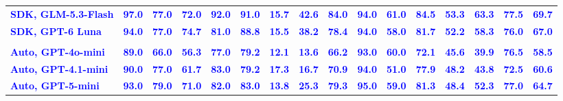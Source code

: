 \documentclass{article}
\newcommand{\ours}{\rowcolor{oursbg}}
\newcommand{\nativechange}[1]{\textcolor{blue}{#1}}
\newlength{\mw}\newlength{\cw}
\begin{document}
\begin{table}[t]
\begin{tabular}{@{}>{\raggedright\arraybackslash}p{\mw}*{15}{>{\centering\arraybackslash}p{\cw}}@{}}
\ours \nativechange{\textbf{SDK, GLM-5.3-Flash}} & \nativechange{\textbf{97.0}} & \nativechange{\textbf{77.0}} & \nativechange{\textbf{72.0}} & \nativechange{\textbf{92.0}} & \nativechange{\textbf{91.0}} & \nativechange{\textbf{15.7}} & \nativechange{\textbf{42.6}} & \nativechange{\textbf{84.0}} & \nativechange{\textbf{94.0}} & \nativechange{\textbf{61.0}} & \nativechange{\textbf{84.5}} & \nativechange{\textbf{53.3}} & \nativechange{\textbf{63.3}} & \nativechange{\textbf{77.5}} & \nativechange{\textbf{69.7}} \\
\ours \nativechange{\textbf{SDK, GPT-6 Luna}} & \nativechange{\textbf{94.0}} & \nativechange{\textbf{77.0}} & \nativechange{\textbf{74.7}} & \nativechange{\textbf{81.0}} & \nativechange{\textbf{88.8}} & \nativechange{\textbf{15.5}} & \nativechange{\textbf{38.2}} & \nativechange{\textbf{78.4}} & \nativechange{\textbf{94.0}} & \nativechange{\textbf{58.0}} & \nativechange{\textbf{81.7}} & \nativechange{\textbf{52.2}} & \nativechange{\textbf{58.3}} & \nativechange{\textbf{76.0}} & \nativechange{\textbf{67.0}} \\
\multicolumn{16}{l}{\nativechange{\textbf{SDK: per-store automatic configuration}}}\\
\ours \nativechange{\textbf{Auto, GPT-4o-mini}} & \nativechange{\textbf{89.0}} & \nativechange{\textbf{66.0}} & \nativechange{\textbf{56.3}} & \nativechange{\textbf{77.0}} & \nativechange{\textbf{79.2}} & \nativechange{\textbf{12.1}} & \nativechange{\textbf{13.6}} & \nativechange{\textbf{66.2}} & \nativechange{\textbf{93.0}} & \nativechange{\textbf{60.0}} & \nativechange{\textbf{72.1}} & \nativechange{\textbf{45.6}} & \nativechange{\textbf{39.9}} & \nativechange{\textbf{76.5}} & \nativechange{\textbf{58.5}} \\
\ours \nativechange{\textbf{Auto, GPT-4.1-mini}} & \nativechange{\textbf{90.0}} & \nativechange{\textbf{77.0}} & \nativechange{\textbf{61.7}} & \nativechange{\textbf{83.0}} & \nativechange{\textbf{79.2}} & \nativechange{\textbf{17.3}} & \nativechange{\textbf{16.7}} & \nativechange{\textbf{70.9}} & \nativechange{\textbf{94.0}} & \nativechange{\textbf{51.0}} & \nativechange{\textbf{77.9}} & \nativechange{\textbf{48.2}} & \nativechange{\textbf{43.8}} & \nativechange{\textbf{72.5}} & \nativechange{\textbf{60.6}} \\
\ours \nativechange{\textbf{Auto, GPT-5-mini}} & \nativechange{\textbf{93.0}} & \nativechange{\textbf{79.0}} & \nativechange{\textbf{71.0}} & \nativechange{\textbf{82.0}} & \nativechange{\textbf{83.0}} & \nativechange{\textbf{13.8}} & \nativechange{\textbf{25.3}} & \nativechange{\textbf{79.3}} & \nativechange{\textbf{95.0}} & \nativechange{\textbf{59.0}} & \nativechange{\textbf{81.3}} & \nativechange{\textbf{48.4}} & \nativechange{\textbf{52.3}} & \nativechange{\textbf{77.0}} & \nativechange{\textbf{64.7}} \\
\bottomrule
\end{tabular}
\end{table}
\end{document}
